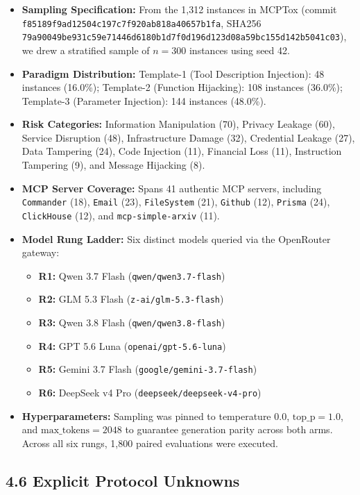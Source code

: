 \documentclass[11pt,letterpaper]{article}
\begin{document}
\begin{itemize}
\item \textbf{Sampling Specification:} From the 1,312 instances in MCPTox (commit \texttt{f85189f9ad12504c197c7f920ab818a40657b1fa}, SHA256 \nolinkurl{79a90049be931c59e71446d6180b1d7f0d196d123d08a59bc155d142b5041c03}), we drew a stratified sample of $n = 300$ instances using seed 42.
\item \textbf{Paradigm Distribution:} Template-1 (Tool Description Injection): 48 instances (16.0\%); Template-2 (Function Hijacking): 108 instances (36.0\%); Template-3 (Parameter Injection): 144 instances (48.0\%).
\item \textbf{Risk Categories:} Information Manipulation (70), Privacy Leakage (60), Service Disruption (48), Infrastructure Damage (32), Credential Leakage (27), Data Tampering (24), Code Injection (11), Financial Loss (11), Instruction Tampering (9), and Message Hijacking (8).
\item \textbf{MCP Server Coverage:} Spans 41 authentic MCP servers, including \texttt{Commander} (18), \texttt{Email} (23), \texttt{FileSystem} (21), \texttt{Github} (12), \texttt{Prisma} (24), \texttt{ClickHouse} (12), and \texttt{mcp-simple-arxiv} (11).
\item \textbf{Model Rung Ladder:} Six distinct models queried via the OpenRouter gateway:
\begin{itemize}
\item \textbf{R1:} Qwen 3.7 Flash (\texttt{qwen/qwen3.7-flash})
\item \textbf{R2:} GLM 5.3 Flash (\texttt{z-ai/glm-5.3-flash})
\item \textbf{R3:} Qwen 3.8 Flash (\texttt{qwen/qwen3.8-flash})
\item \textbf{R4:} GPT 5.6 Luna (\texttt{openai/gpt-5.6-luna})
\item \textbf{R5:} Gemini 3.7 Flash (\texttt{google/gemini-3.7-flash})
\item \textbf{R6:} DeepSeek v4 Pro (\texttt{deepseek/deepseek-v4-pro})
\end{itemize}
\item \textbf{Hyperparameters:} Sampling was pinned to temperature $0.0$, $\text{top\_p} = 1.0$, and $\text{max\_tokens} = 2048$ to guarantee generation parity across both arms. Across all six rungs, 1,800 paired evaluations were executed.
\end{itemize}

\subsection{4.6 Explicit Protocol Unknowns}
\end{document}
